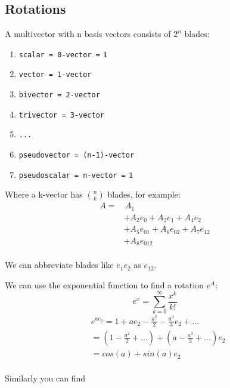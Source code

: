 \documentclass[twoside]{article}
\newcommand{\F}[2]{\frac{#1}{#2}} %
\newcommand{\aside}[1]{\begin{flushright}\scriptsize{#1}\end{flushright}}
\begin{document}
\begin{multicols*}{2}
        \section{Rotations}
            \par
                A multivector with n basis vectors consists of $ 2^n $ blades:
                \begin{enumerate}[-]
                    \item \texttt{scalar = 0-vector =} $\mathbf{1}$
                    \item \texttt{vector = 1-vector}
                    \item \texttt{bivector = 2-vector}
                    \item \texttt{trivector = 3-vector}
                    \item \texttt{...}
                    \item \texttt{pseudovector = (n-1)-vector}
                    \item \texttt{pseudoscalar = n-vector =} $\mathbb{1}$
                \end{enumerate} \vspace{5px}
                Where a k-vector has $n \choose k$ blades, for example:
                $$\begin{aligned}
                    A = & \, A_1 \\
                    &+ A_2 e_0 + A_3 e_1 + A_4 e_2 \\
                    &+ A_5 e_{01} + A_6 e_{02} + A_7 e_{12} \\
                    &+ A_8 e_{012} \\
                \end{aligned}$$
                \aside{We can abbreviate blades like $ e_1 e_2 $ as $ e_{12} $.}
            \par
                We can use the exponential function to find a rotation $e^A$:
                $$ e^x = \sum_{k=0}^\infty \F{x^k}{k!} $$
                $$\begin{aligned}
                    &e^{a e_2} = 1 + a e_2 - \F{a^2}{2} - \F{a^3}{3} e_2 + ... \\
                    &= (1 - \F{a^2}{2} + ...) + (a - \F{a^3}{3} + ...) e_2 \\
                    &= cos(a) + sin(a) e_2 \\
                \end{aligned}$$
            \par
                Similarly you can find

\end{multicols*}
\end{document}
